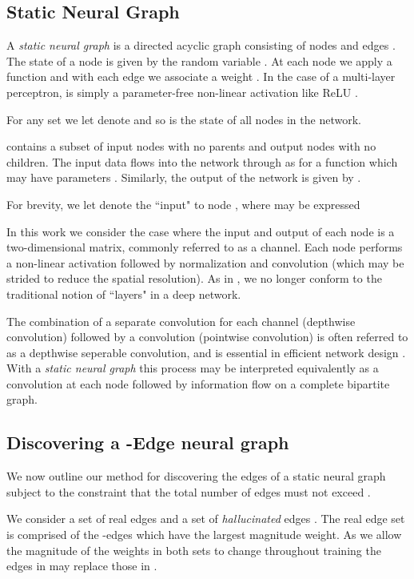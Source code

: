 \documentclass{article}
\begin{document}
\subsection{Static Neural Graph}
A \textit{static neural graph} is a directed acyclic graph  consisting of nodes  and edges . The state of a node  is given by the random variable . At each node  we apply a function  and with each edge  we associate a weight . In the case of a multi-layer perceptron,  is simply a parameter-free non-linear activation like ReLU \cite{alexnet}.

For any set  we let  denote  and so  is the state of all nodes in the network.

 contains a subset of input nodes  with no parents and output nodes  with no children. The input data  flows into the network through  as  for a function  which may have parameters . Similarly, the output of the network  is given by .

For brevity, we let  denote the ``input" to node , where  may be expressed


In this work we consider the case where the input and output of each node is a two-dimensional matrix, commonly referred to as a channel. Each node performs a non-linear activation followed by normalization and convolution (which may be strided to reduce the spatial resolution). As in \cite{randwire}, we no longer conform to the traditional notion of ``layers" in a deep network.

The combination of a separate  convolution for each channel (depthwise convolution) followed by a  convolution (pointwise convolution) is often referred to as a depthwise seperable convolution, and is essential in efficient network design \cite{mobilenetv1, shufflenetv2}. With a \textit{static neural graph} this process may be interpreted equivalently as a  convolution at each node followed by information flow on a complete bipartite graph. 
\subsection{Discovering a -Edge neural graph}
We now outline our method for discovering the edges of a static neural graph subject to the constraint that the total number of edges must not exceed .

We consider a set of real edges  and a set of \textit{hallucinated} edges . The real edge set is comprised of the -edges which have the largest magnitude weight. As we allow the magnitude of the weights in both sets to change throughout training the edges in  may replace those in . 
\end{document}
